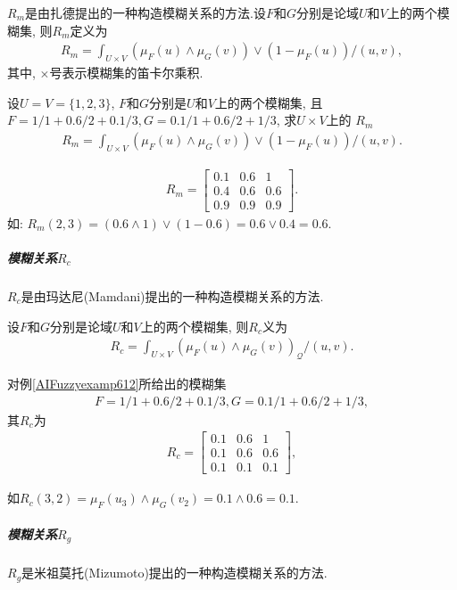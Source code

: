 $R_m$是由扎德提出的一种构造模糊关系的方法.设$F$和$G$分别是论域$U$和$V$上的两个模糊集, 则$R_m$定义为
\begin{align}
  R_{m}=\int_{U \times V}\left(\mu_{F}(u) \wedge \mu_{G}(v)\right) \vee\left(1-\mu_{F}(u)\right) /(u, v),
\end{align}
其中, $\times$号表示模糊集的笛卡尔乘积.
\begin{example}\label{AIFuzzyexamp612}
 设$U=V=\{1,2,3\}$, $F$和$G$分别是$U$和$V$上的两个模糊集, 且$F=1/1+0.6/2+0.1/3,G=0.1/1+0.6/2+1/3$, 求$U\times V$上的 $R_m$
\begin{align*}
  R_{m}=\int_{U \times V}\left(\mu_{F}(u) \wedge \mu_{G}(v)\right) \vee\left(1-\mu_{F}(u)\right) /(u, v).
\end{align*}
\end{example}
\begin{result}
\begin{align*}
  R_{m}=\left[\begin{array}{ccc}{0.1} & {0.6} & {1} \\ {0.4} & {0.6} & {0.6} \\ {0.9} & {0.9} & {0.9}\end{array}\right].
\end{align*}
如: $R_m(2, 3) =(0.6\wedge 1)\vee (1-0.6)=0.6\vee 0.4=0.6$.
\end{result}
\subparagraph{模糊关系$R_c$}
$R_c$是由玛达尼(Mamdani)提出的一种构造模糊关系的方法.

设$F$和$G$分别是论域$U$和$V$上的两个模糊集, 则$R_c$义为
\begin{align*}
  R_{c}=\int_{U \times V}\left(\mu_{F}(u) \wedge \mu_{G}(v)\right)_{\mathcal{Q}} /(u, v).
\end{align*}
\begin{example}
对例\ref{AIFuzzyexamp612}所给出的模糊集
\begin{align*}
  F=1/1+0.6/2+0.1/3, G=0.1/1+0.6/2+1/3,
\end{align*}
其$R_c$为
\begin{align*}
  R_{c}=\left[\begin{array}{ccc}{0.1} & {0.6} & {1} \\ {0.1} & {0.6} & {0.6} \\ {0.1} & {0.1} & {0.1}\end{array}\right],
\end{align*}
\end{example}
如$R_{c}(3,2)=\mu_{F}\left(u_{3}\right) \wedge \mu_{G}\left(v_{2}\right)=0.1 \wedge 0.6=0.1$.
\subparagraph{模糊关系$R_g$}
$R_g$是米祖莫托(Mizumoto)提出的一种构造模糊关系的方法.

